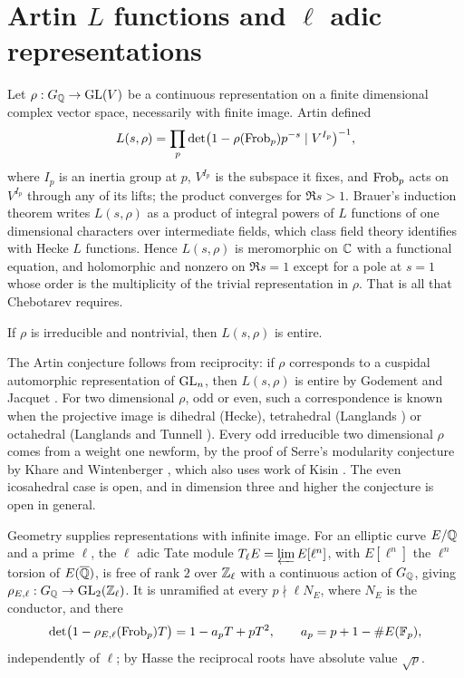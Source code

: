 \section{Artin \texorpdfstring{$L$}{L} functions and \texorpdfstring{$\ell$}{l} adic representations}\label{sec:ch3artin}

Let $\rho:G_{\mathbb{Q}}\to\mathrm{GL}(V)$ be a continuous representation on a finite dimensional complex vector space, necessarily with finite image. Artin \cite{artin1924} defined
\[
L(s,\rho)=\prod_p\det\bigl(1-\rho(\operatorname{Frob}_p)p^{-s}\mid V^{I_p}\bigr)^{-1},
\]
where $I_p$ is an inertia group at $p$, $V^{I_p}$ is the subspace it fixes, and $\operatorname{Frob}_p$ acts on $V^{I_p}$ through any of its lifts; the product converges for $\Re s>1$. Brauer's induction theorem \cite{brauer1947} writes $L(s,\rho)$ as a product of integral powers of $L$ functions of one dimensional characters over intermediate fields, which class field theory identifies with Hecke $L$ functions. Hence $L(s,\rho)$ is meromorphic on $\mathbb{C}$ with a functional equation, and holomorphic and nonzero on $\Re s=1$ except for a pole at $s=1$ whose order is the multiplicity of the trivial representation in $\rho$. That is all that Chebotarev requires.

\begin{conjecture}[Artin]
If $\rho$ is irreducible and nontrivial, then $L(s,\rho)$ is entire.
\end{conjecture}

The Artin conjecture follows from reciprocity: if $\rho$ corresponds to a cuspidal automorphic representation of $\mathrm{GL}_n$, then $L(s,\rho)$ is entire by Godement and Jacquet \cite{godementjacquet1972}. For two dimensional $\rho$, odd or even, such a correspondence is known when the projective image is dihedral (Hecke), tetrahedral (Langlands \cite{langlands1980}) or octahedral (Langlands and Tunnell \cite{tunnell1981}). Every odd irreducible two dimensional $\rho$ comes from a weight one newform, by the proof of Serre's modularity conjecture by Khare and Wintenberger \cite{kharewintenberger2009,kharewintenberger2009b}, which also uses work of Kisin \cite{kisin2009}. The even icosahedral case is open, and in dimension three and higher the conjecture is open in general.

Geometry supplies representations with infinite image. For an elliptic curve $E/\mathbb{Q}$ and a prime $\ell$, the $\ell$ adic Tate module $T_\ell E=\varprojlim E[\ell^n]$, with $E[\ell^n]$ the $\ell^n$ torsion of $E(\overline{\mathbb{Q}})$, is free of rank $2$ over $\mathbb{Z}_\ell$ with a continuous action of $G_{\mathbb{Q}}$, giving $\rho_{E,\ell}:G_{\mathbb{Q}}\to\mathrm{GL}_2(\mathbb{Z}_\ell)$. It is unramified at every $p\nmid\ell N_E$, where $N_E$ is the conductor, and there
\[
\det\bigl(1-\rho_{E,\ell}(\operatorname{Frob}_p)T\bigr)=1-a_pT+pT^2,\qquad a_p=p+1-\#E(\mathbb{F}_p),
\]
independently of $\ell$; by Hasse the reciprocal roots have absolute value $\sqrt p$.

